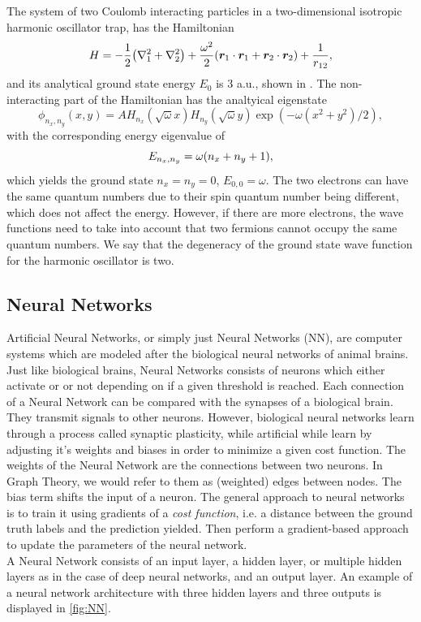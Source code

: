 The system of two Coulomb interacting particles in a two-dimensional isotropic harmonic oscillator trap, has the Hamiltonian 
\begin{equation}\label{eq:2dHamiltonian}
    H = -\frac{1}{2}\qty(\laplacian_1 + \laplacian_2) + \frac{\omega^2}{2}\qty(\bm{r}_1\cdot\bm{r}_1 + \bm{r}_2\cdot\bm{r}_2) + \frac{1}{r_{12}}, 
\end{equation}
and its analytical ground state energy $E_0$ is $3$ a.u., shown in \citep{PhysRevA.48.3561}. The non-interacting part of the Hamiltonian has the analtyical eigenstate 
\begin{equation}
    \phi_{n_x,n_y}(x,y) = A H_{n_x}(\sqrt{\omega}x)H_{n_y}(\sqrt{\omega}y)\exp{(-\omega(x^2+y^2)/2)}, 
\end{equation}
with the corresponding energy eigenvalue of 
\begin{equation*}
    E_{n_x, n_y} = \omega\qty(n_x + n_y + 1), 
\end{equation*}
which yields the ground state $n_x = n_y = 0$, $E_{0, 0}=\omega$. The two electrons can have the same quantum numbers due to their spin quantum number being different, which does not affect the energy. However, if there are more electrons, the wave functions need to take into account that two fermions cannot occupy the same quantum numbers. We say that the degeneracy of the ground state wave function for the harmonic oscillator is two. 


\subsection{Neural Networks}
Artificial Neural Networks, or simply just Neural Networks (NN), are computer systems which are modeled after the biological neural networks of animal brains. Just like biological brains, Neural Networks consists of neurons which either activate or or not depending on if a given threshold is reached. Each connection of a Neural Network can be compared with the synapses of a biological brain. They transmit signals to other neurons. However, biological neural networks learn through a process called synaptic plasticity, while artificial while learn by adjusting it's weights and biases in order to minimize a given cost function. The weights of the Neural Network are the connections between two neurons. In Graph Theory, we would refer to them as (weighted) edges between nodes. The bias term shifts the input of a neuron. The general approach to neural networks is to train it using gradients of a \textit{cost function}, i.e. a distance between the ground truth labels and the prediction yielded. Then perform a gradient-based approach to update the parameters of the neural network. 
\\
A Neural Network consists of an input layer, a hidden layer, or multiple hidden layers as in the case of deep neural networks, and an output layer. An example of a neural network architecture with three hidden layers and three outputs is displayed in \autoref{fig:NN}. %

